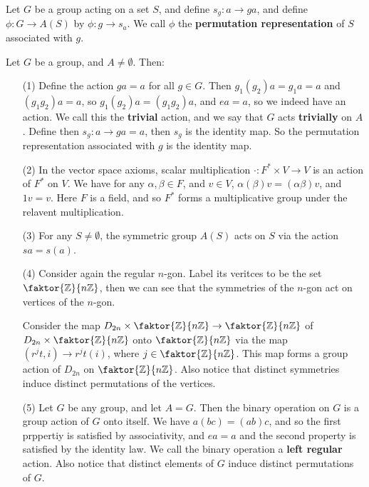 \begin{definition}
    Let $G$ be a group acting on a set  $S$, and define $s_g:a \rightarrow
    ga$, and define $\phi:G \rightarrow A(S)$ by $\phi:g \rightarrow s_a$.
    We call $\phi$ the  \textbf{permutation representation} of $S$ associated
    with  $g$.
\end{definition}

\begin{example}
    Let $G$ be a group, and  $A \neq \emptyset$. Then:

    \begin{enumerate}
        \item[(1)] Define the action $ga=a$ for all  $g \in G$. Then
            $g_1(g_2)a=g_1a=a$ and $(g_1g_2)a=a$, so $g_1(g_2)a=(g_1g_2)a$, and
            $ea=a$, so we indeed have an action. We call this the
            \textbf{trivial} action, and we say that $G$ acts
            \textbf{trivially} on $A$. Define then  $s_g:a \rightarrow
            ga=a$, then $s_g$ is the identity map. So the permutation
            representation associated with  $g$ is the identity map.

        \item[(2)] In the vector space axioms, scalar multiplication $\cdot:F^*
            \times V \rightarrow V$ is an action of $F^*$ on  $V$. We have for any
             $\alpha,\beta \in F$, and  $v \in V$,
             $\alpha(\beta)v=(\alpha\beta)v$, and $1v=v$. Here $F$ is a field,
             and so  $F^*$ forms a multiplicative group under the relavent
             multiplication.

         \item [(3)] For any $S \neq \emptyset$, the symmetric group  $A(S)$
             acts on $S$ via the action  $sa=s(a)$.

         \item[(4)] Consider again the regular $n$-gon. Label its veritces to be
             the set $\faktor{\Z}{n\Z}$, then we can see that the symmetries of
             the $n$-gon act on vertices of the $n$-gon.

             Consider the map $D_{2n} \times \faktor{\Z}{n\Z}\rightarrow
             \faktor{\Z}{n\Z}$ of $D_{2n} \times \faktor{\Z}{n\Z}$ onto
             $\faktor{\Z}{n\Z}$ via the map $(r^jt,i) \rightarrow r^jt(i)$,
             where $j \in \faktor{\Z}{n\Z}$. This map forms a group action of
             $D_{2n}$ on $\faktor{\Z}{n\Z}$. Also notice that distinct
             symmetries induce distinct permutations of the vertices.

         \item[(5)] Let $G$ be any group, and let  $A=G$. Then the binary
             operation on $G$ is a group action of  $G$ onto itself. We have
             $a(bc)=(ab)c$, and so the first prppertiy is satisfied by
             associativity, and $ea=a$ and the second property is satisfied by
             the identity law. We call the binary operation a \textbf{left
             regular} action. Also notice that distinct elements of $G$ induce
             distinct permutations of  $G$.
    \end{enumerate}
\end{example}

